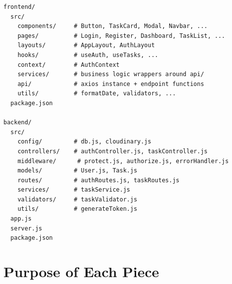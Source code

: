 \begin{diagrambox}
\begin{verbatim}
frontend/
  src/
    components/     # Button, TaskCard, Modal, Navbar, ...
    pages/          # Login, Register, Dashboard, TaskList, ...
    layouts/        # AppLayout, AuthLayout
    hooks/          # useAuth, useTasks, ...
    context/        # AuthContext
    services/       # business logic wrappers around api/
    api/            # axios instance + endpoint functions
    utils/          # formatDate, validators, ...
  package.json

backend/
  src/
    config/         # db.js, cloudinary.js
    controllers/    # authController.js, taskController.js
    middleware/      # protect.js, authorize.js, errorHandler.js
    models/         # User.js, Task.js
    routes/         # authRoutes.js, taskRoutes.js
    services/       # taskService.js
    validators/     # taskValidator.js
    utils/          # generateToken.js
  app.js
  server.js
  package.json
\end{verbatim}
\end{diagrambox}

\section{Purpose of Each Piece}


